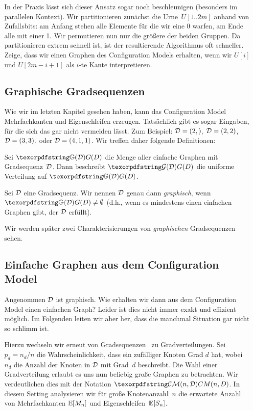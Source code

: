 \begin{exercise}
    In der Praxis lässt sich dieser Ansatz sogar noch beschleunigen (besonders im parallelen Kontext).
    Wir partitionieren zunächst die Urne~$U[1..2m]$ anhand von Zufallsbits:
    am Anfang stehen alle Elemente für die wir eine 0 warfen, am Ende alle mit einer 1.
    Wir permutieren nun nur die größere der beiden Gruppen.
    Da partitionieren extrem schnell ist, ist der resultierende Algorithmus oft schneller.
    Zeige, dass wir einen Graphen des Configuration Models erhalten, wenn wir $U[i]$ und $U[2m - i + 1]$ als $i$-te Kante interpretieren.
\end{exercise}

\subsection{Graphische Gradsequenzen}
Wie wir im letzten Kapitel gesehen haben, kann das Configuration Model Mehrfachkanten und Eigenschleifen erzeugen.
Tatsächlich gibt es sogar Eingaben, für die sich das gar nicht vermeiden lässt.
Zum Beispiel: $\mathcal{D} = (2,)$, $\mathcal{D} = (2, 2)$, $\mathcal{D} = (3,3)$, oder $\mathcal{D} = (4, 1, 1)$.
Wir treffen daher folgende Definitionen:

\begin{definition}
    Sei $\gd$ die Menge aller einfache Graphen mit Gradsequenz~$\mathcal{D}$.
    Dann beschreibt $\Gd$ die uniforme Verteilung auf $\gd$.
\end{definition}

\begin{definition}
    Sei $\mathcal{D}$ eine Gradsequenz.
    Wir nennen $\mathcal{D}$ genau dann \emph{graphisch}, wenn $\gd \neq \emptyset$ (d.h., wenn es mindestens einen einfachen Graphen gibt, der $\mathcal{D}$ erfüllt).
\end{definition}

\noindent
Wir werden später zwei Charakterisierungen von \emph{graphischen} Gradsequenzen sehen.

\subsection{Einfache Graphen aus dem Configuration Model}
Angenommen $\mathcal{D}$ ist graphisch.
Wie erhalten wir dann aus dem Configuration Model einen einfachen Graph?
Leider ist dies nicht immer exakt und effizient möglich.
Im Folgenden leiten wir aber her, dass die manchmal Situation gar nicht so schlimm ist.

Hierzu wechseln wir erneut von Gradsequenzen~\degseq{} zu Gradverteilungen.
Sei $p_d = n_d / n$ die Wahrscheinlichkeit, dass ein zufälliger Knoten Grad $d$ hat, wobei $n_d$ die Anzahl der Knoten in $\mathcal{D}$ mit Grad~$d$ beschreibt.
Die Wahl einer Gradverteilung erlaubt es uns nun beliebig große Graphen zu betrachten.
Wir verdeutlichen dies mit der Notation $\CMnd$.
In diesem Setting analysieren wir für große Knotenanzahl~$n$ die erwartete Anzahl von Mehrfachkanten $\mathbb{E}\!\left[M_n\right]$ und Eigenschleifen~$\mathbb{E}\!\left[S_n\right]$.

